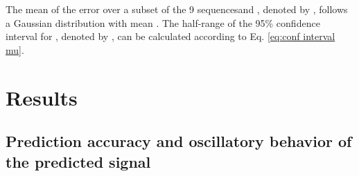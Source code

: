\documentclass[twocolumn,a4paper]{svjour3} \sloppy          \smartqed
\begin{document}
The mean of the error  over a subset  of the 9 sequences\footnotemark and , denoted by , follows a Gaussian distribution with mean . The half-range of the 95\% confidence interval for , denoted by , can be calculated according to Eq. \ref{eq:conf interval mu}.





\section{Results}

\subsection{Prediction accuracy and oscillatory behavior of the predicted signal}
\label{section:accuracy and jitter}
\end{document}
